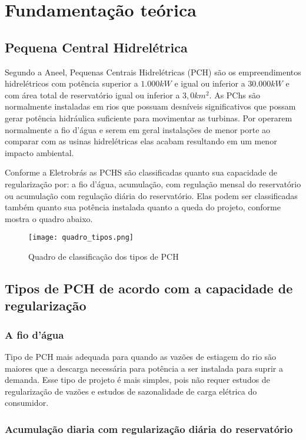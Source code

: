 \section{Fundamentação teórica}
\subsection{Pequena Central Hidrelétrica}
Segundo a Aneel, Pequenas Centrais Hidrelétricas (PCH) são os empreendimentos hidrelétricos com potência superior a $1.000 kW$ e igual ou inferior a $30.000 kW$ e com área total de reservatório igual ou inferior a $3,0 km^2$. As PChs são normalmente instaladas em rios que possuam desníveis significativos que possam gerar potência hidráulica suficiente para movimentar as turbinas. Por operarem normalmente a fio d’água e serem em geral instalações de menor porte ao comparar com as usinas hidrelétricas elas acabam resultando em um menor impacto ambiental.

Conforme a Eletrobrás as PCHS são classificadas quanto sua capacidade de regularização por: a fio d’água, acumulação, com regulação mensal do reservatório ou acumulação com regulação diária do reservatório. Elas podem ser classificadas também quanto sua potência instalada quanto a queda do projeto, conforme mostra o quadro abaixo.

\begin{figure}[h]
	\centering
	\texttt{[image: quadro\_tipos.png]}
	\caption{Quadro de classificação dos tipos de PCH}
	\label{fig:tcp_packet}
\end{figure}

\subsection{Tipos de PCH de acordo com a capacidade de regularização}
\subsubsection{A fio d’água} 

Tipo de PCH mais adequada para quando as vazões de estiagem do rio são maiores que a descarga necessária para potência a ser instalada para suprir a demanda.
Esse tipo de projeto é mais simples, pois não requer estudos de regularização de vazões e estudos de sazonalidade de carga elétrica do consumidor.

\subsubsection{Acumulação diaria com regularização diária do reservatório }

